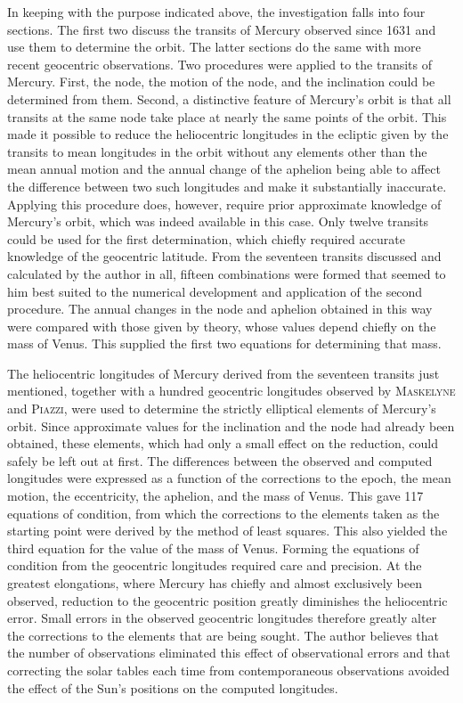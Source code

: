 In keeping with the purpose indicated above, the investigation falls into four sections. The first two discuss the transits of Mercury observed since 1631 and use them to determine the orbit. The latter sections do the same with more recent geocentric observations. Two procedures were applied to the transits of Mercury. First, the node, the motion of the node, and the inclination could be determined from them. Second, a distinctive feature of Mercury's orbit is that all transits at the same node take place at nearly the same points of the orbit. This made it possible to reduce the heliocentric longitudes in the ecliptic given by the transits to mean longitudes in the orbit without any elements other than the mean annual motion and the annual change of the aphelion being able to affect the difference between two such longitudes and make it substantially inaccurate. Applying this procedure does, however, require prior approximate knowledge of Mercury's orbit, which was indeed available in this case. Only twelve transits could be used for the first determination, which chiefly required accurate knowledge of the geocentric latitude. From the seventeen transits discussed and calculated by the author in all, fifteen combinations were formed that seemed to him best suited to the numerical development and application of the second procedure. The annual changes in the node and aphelion obtained in this way were compared with those given by theory, whose values depend chiefly on the mass of Venus. This supplied the first two equations for determining that mass.

The heliocentric longitudes of Mercury derived from the seventeen transits just mentioned, together with a hundred geocentric longitudes observed by \textsc{Maskelyne} and \textsc{Piazzi}, were used to determine the strictly elliptical elements of Mercury's orbit. Since approximate values for the inclination and the node had already been obtained, these elements, which had only a small effect on the reduction, could safely be left out at first. The differences between the observed and computed longitudes were expressed as a function of the corrections to the epoch, the mean motion, the eccentricity, the aphelion, and the mass of Venus. This gave 117 equations of condition, from which the corrections to the elements taken as the starting point were derived by the method of least squares. This also yielded the third equation for the value of the mass of Venus. Forming the equations of condition from the geocentric longitudes required care and precision. At the greatest elongations, where Mercury has chiefly and almost exclusively been observed, reduction to the geocentric position greatly diminishes the heliocentric error. Small errors in the observed geocentric longitudes therefore greatly alter the corrections to the elements that are being sought. The author believes that the number of observations eliminated this effect of observational errors and that correcting the solar tables each time from contemporaneous observations avoided the effect of the Sun's positions on the computed longitudes.

